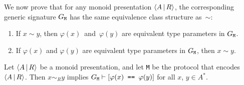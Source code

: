 \documentclass[../generics]{subfiles}
\begin{document}
We now prove that for any monoid presentation $\langle A\,|\,R\rangle$, the corresponding generic signature $G_\texttt{M}$ has the same equivalence class structure as~$\sim$:
\begin{enumerate}
\item If $x\sim y$, then $\varphi(x)$~and~$\varphi(y)$ are equivalent type parameters in $G_\texttt{M}$.
\item If $\varphi(x)$ and $\varphi(y)$ are equivalent type parameters in $G_\texttt{M}$, then $x\sim y$.
\end{enumerate}

\begin{theorem}\label{path to derivation}
Let $\langle A\,|\,R\rangle$ be a monoid presentation, and let \texttt{M} be the protocol that encodes $\langle A\,|\,R\rangle$. Then $x\sim_R y$ implies $G_\texttt{M}\vdash[\texttt{$\varphi(x)$ == $\varphi(y)$}]$ for all $x$, $y\in A^*$.
\end{theorem}
\end{document}

